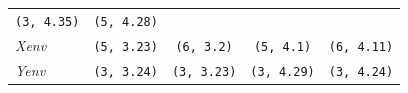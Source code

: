 \documentclass[num-refs]{wiley-article}
\begin{document}
\begin{longtable}[]{@{}lcccc@{}}
\begin{minipage}[t]{0.19\columnwidth}
\texttt{(3,\ 4.35)}\strut
\end{minipage} & \begin{minipage}[t]{0.19\columnwidth}\centering\strut
\texttt{(5,\ 4.28)}\strut
\end{minipage}\tabularnewline
\begin{minipage}[t]{0.09\columnwidth}\raggedright\strut
\emph{Xenv}\strut
\end{minipage} & \begin{minipage}[t]{0.19\columnwidth}\centering\strut
\texttt{(5,\ 3.23)}\strut
\end{minipage} & \begin{minipage}[t]{0.19\columnwidth}\centering\strut
\texttt{(6,\ 3.2)}\strut
\end{minipage} & \begin{minipage}[t]{0.19\columnwidth}\centering\strut
\texttt{(5,\ 4.1)}\strut
\end{minipage} & \begin{minipage}[t]{0.19\columnwidth}\centering\strut
\texttt{(6,\ 4.11)}\strut
\end{minipage}\tabularnewline
\begin{minipage}[t]{0.09\columnwidth}\raggedright\strut
\emph{Yenv}\strut
\end{minipage} & \begin{minipage}[t]{0.19\columnwidth}\centering\strut
\texttt{(3,\ 3.24)}\strut
\end{minipage} & \begin{minipage}[t]{0.19\columnwidth}\centering\strut
\texttt{(3,\ 3.23)}\strut
\end{minipage} & \begin{minipage}[t]{0.19\columnwidth}\centering\strut
\texttt{(3,\ 4.29)}\strut
\end{minipage} & \begin{minipage}[t]{0.19\columnwidth}\centering\strut
\texttt{(3,\ 4.24)}\strut
\end{minipage}\tabularnewline
\bottomrule
\end{longtable}
\end{document}
